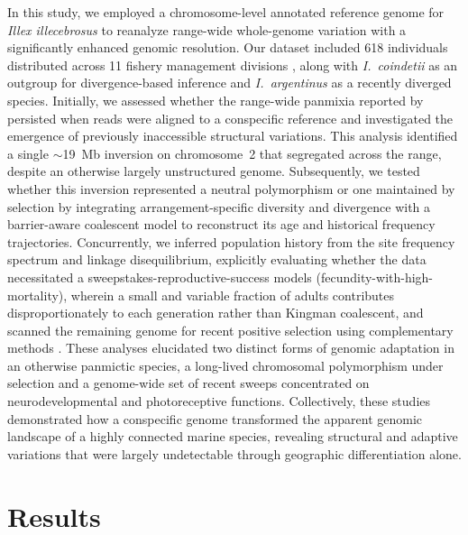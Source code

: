 \documentclass[11pt]{article}
\newcommand{\illex}{\textit{Illex illecebrosus}}
\newcommand{\coin}{\textit{I.\ coindetii}}
\begin{document}
In this study, we employed a chromosome-level annotated reference genome for \illex{} \citep{small2026} to reanalyze range-wide whole-genome variation with a significantly enhanced genomic resolution. Our dataset included 618 individuals distributed across 11 fishery management divisions \citep{baker2025}, along with \coin{} \citep{coindetii2025} as an outgroup for divergence-based inference and \textit{I.\ argentinus} as a recently diverged species. Initially, we assessed whether the range-wide panmixia reported by \citet{baker2025} persisted when reads were aligned to a conspecific reference and investigated the emergence of previously inaccessible structural variations. This analysis identified a single $\sim$19~Mb inversion on chromosome~2 that segregated across the range, despite an otherwise largely unstructured genome. Subsequently, we tested whether this inversion represented a neutral polymorphism or one maintained by selection by integrating arrangement-specific diversity and divergence with a barrier-aware coalescent model to reconstruct its age and historical frequency trajectories. Concurrently, we inferred population history from the site frequency spectrum and linkage disequilibrium, explicitly evaluating whether the data necessitated a sweepstakes-reproductive-success models (fecundity-with-high-mortality), wherein a small and variable fraction of adults contributes disproportionately to each generation \citep{hedgecock2011,eldon2006,arnason2023} rather than Kingman coalescent, and scanned the remaining genome for recent positive selection using complementary methods \citep{kern2018diploshic,alachiotis2018raisd,degiorgio2016}. These analyses elucidated two distinct forms of genomic adaptation in an otherwise panmictic species, a long-lived chromosomal polymorphism under selection and a genome-wide set of recent sweeps concentrated on neurodevelopmental and photoreceptive functions. Collectively, these studies demonstrated how a conspecific genome transformed the apparent genomic landscape of a highly connected marine species, revealing structural and adaptive variations that were largely undetectable through geographic differentiation alone.


\section{Results}
\end{document}
